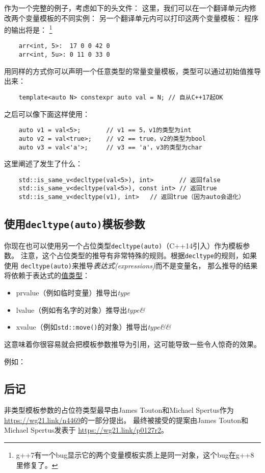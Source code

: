 作为一个完整的例子，考虑如下的头文件：
这里，我们可以在一个翻译单元内修改两个变量模板的不同实例：
另一个翻译单元内可以打印这两个变量模板：
程序的输出将是：
\footnote{g++7有一个bug显示它的两个变量模板实质上是同一对象，这个bug在g++8里修复了。}
\begin{lstlisting}
    arr<int, 5>:  17 0 0 42 0
    arr<int, 5u>: 0 11 0 33 0
\end{lstlisting}
用同样的方式你可以声明一个任意类型的常量变量模板，类型可以通过初始值推导出来：
\begin{lstlisting}
    template<auto N> constexpr auto val = N; // 自从C++17起OK
\end{lstlisting}
之后可以像下面这样使用：
\begin{lstlisting}
    auto v1 = val<5>;       // v1 == 5，v1的类型为int
    auto v2 = val<true>;    // v2 == true，v2的类型为bool
    auto v3 = val<'a'>;     // v3 == 'a'，v3的类型为char
\end{lstlisting}
这里阐述了发生了什么：
\begin{lstlisting}
    std::is_same_v<decltype(val<5>), int>       // 返回false
    std::is_same_v<decltype(val<5>), const int> // 返回true
    std::is_same_v<decltype(v1), int>   // 返回true（因为auto会退化）
\end{lstlisting}

\subsection{使用\texttt{decltype(auto)}模板参数}
你现在也可以使用另一个占位类型\texttt{decltype(auto)}（C++14引入）作为模板参数。
注意，这个占位类型的推导有非常特殊的规则。根据\texttt{decltype}的规则，如果使用
\texttt{decltype(auto)}来推导\emph{表达式(expressions)}而不是变量名，
那么推导的结果将依赖于表达式的\hyperref[ch5.3.1]{值类型}：
\begin{itemize}[leftmargin=*]
    \item prvalue（例如临时变量）推导出\emph{type}
    \item lvalue（例如有名字的对象）推导出\emph{type\&}
    \item xvalue（例如\texttt{std::move()}的对象）推导出\emph{type\&\&}
\end{itemize}
这意味着你很容易就会把模板参数推导为引用，这可能导致一些令人惊奇的效果。

例如：

\subsection{后记}
非类型模板参数的占位符类型最早由James Touton和Michael Spertus作为
\url{https://wg21.link/n4469}的一部分提出。
最终被接受的提案由James Touton和Michael Spertus发表于
\url{https://wg21.link/p0127r2}。

\setcounter{footnote}{0}